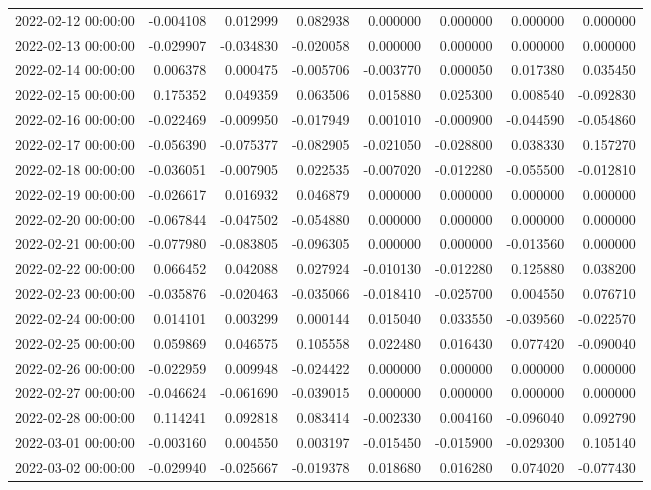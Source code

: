\begin{tabular}{lrrrrrrr}
2022-02-12 00:00:00 & -0.004108 & 0.012999 & 0.082938 & 0.000000 & 0.000000 & 0.000000 & 0.000000 \\
2022-02-13 00:00:00 & -0.029907 & -0.034830 & -0.020058 & 0.000000 & 0.000000 & 0.000000 & 0.000000 \\
2022-02-14 00:00:00 & 0.006378 & 0.000475 & -0.005706 & -0.003770 & 0.000050 & 0.017380 & 0.035450 \\
2022-02-15 00:00:00 & 0.175352 & 0.049359 & 0.063506 & 0.015880 & 0.025300 & 0.008540 & -0.092830 \\
2022-02-16 00:00:00 & -0.022469 & -0.009950 & -0.017949 & 0.001010 & -0.000900 & -0.044590 & -0.054860 \\
2022-02-17 00:00:00 & -0.056390 & -0.075377 & -0.082905 & -0.021050 & -0.028800 & 0.038330 & 0.157270 \\
2022-02-18 00:00:00 & -0.036051 & -0.007905 & 0.022535 & -0.007020 & -0.012280 & -0.055500 & -0.012810 \\
2022-02-19 00:00:00 & -0.026617 & 0.016932 & 0.046879 & 0.000000 & 0.000000 & 0.000000 & 0.000000 \\
2022-02-20 00:00:00 & -0.067844 & -0.047502 & -0.054880 & 0.000000 & 0.000000 & 0.000000 & 0.000000 \\
2022-02-21 00:00:00 & -0.077980 & -0.083805 & -0.096305 & 0.000000 & 0.000000 & -0.013560 & 0.000000 \\
2022-02-22 00:00:00 & 0.066452 & 0.042088 & 0.027924 & -0.010130 & -0.012280 & 0.125880 & 0.038200 \\
2022-02-23 00:00:00 & -0.035876 & -0.020463 & -0.035066 & -0.018410 & -0.025700 & 0.004550 & 0.076710 \\
2022-02-24 00:00:00 & 0.014101 & 0.003299 & 0.000144 & 0.015040 & 0.033550 & -0.039560 & -0.022570 \\
2022-02-25 00:00:00 & 0.059869 & 0.046575 & 0.105558 & 0.022480 & 0.016430 & 0.077420 & -0.090040 \\
2022-02-26 00:00:00 & -0.022959 & 0.009948 & -0.024422 & 0.000000 & 0.000000 & 0.000000 & 0.000000 \\
2022-02-27 00:00:00 & -0.046624 & -0.061690 & -0.039015 & 0.000000 & 0.000000 & 0.000000 & 0.000000 \\
2022-02-28 00:00:00 & 0.114241 & 0.092818 & 0.083414 & -0.002330 & 0.004160 & -0.096040 & 0.092790 \\
2022-03-01 00:00:00 & -0.003160 & 0.004550 & 0.003197 & -0.015450 & -0.015900 & -0.029300 & 0.105140 \\
2022-03-02 00:00:00 & -0.029940 & -0.025667 & -0.019378 & 0.018680 & 0.016280 & 0.074020 & -0.077430 \\

\end{tabular}
